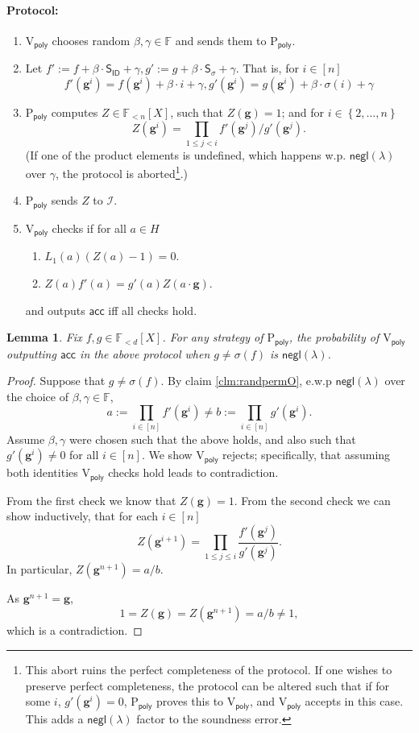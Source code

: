 \documentclass[11pt]{article} %
\newcommand{\F}{\ensuremath{\mathbb F}\xspace}
\newcommand{\sigof}[1]{\ensuremath{\sigma(#1)}\xspace}
\newcommand{\negl}{\ensuremath{\mathsf{negl}(\lambda)}\xspace}
\newcommand{\acc}{\ensuremath{\mathsf{acc}}\xspace}
\newcommand{\defeq}{:=}
\newcommand{\dom}{\ensuremath{H}\xspace}
\newcommand{\prvpoly}{\ensuremath{\mathrm{P_{\mathsf{poly}}}}\xspace}
\newcommand{\verpoly}{\ensuremath{\mathrm{V_{\mathsf{poly}}}}\xspace}
\newcommand{\ideal}{\ensuremath{\mathcal{I}}\xspace}
\newcommand{\set}[1]{\ensuremath{\left\{#1\right\}}\xspace}
\newcommand{\hgen}{\ensuremath{\mathbf{g}}\xspace}
\newcommand{\polysofdeg}[1]{\ensuremath{\F_{< #1}[X]}\xspace}
\newcommand{\sigpoly}{\ensuremath{\mathsf{S_{\sigma}}}\xspace}
\newcommand{\idpoly}{\ensuremath{\mathsf{S_{ID}}}\xspace}
\newtheorem{lemma}{Lemma}[section]
\begin{document}
\paragraph{Protocol:}
\begin{enumerate}
 \item\label{item:betgamma} \verpoly chooses random $\beta,\gamma \in\F$ and sends them to \prvpoly.
 \item Let $f'\defeq f+\beta\cdot  \idpoly +\gamma, g'\defeq g+\beta\cdot \sigpoly + \gamma$.
That is, for $i\in [n]$
 \[f'(\hgen^i) = f(\hgen^i) + \beta\cdot i + \gamma,
 g'(\hgen^i) = g(\hgen^i) + \beta\cdot \sigma(i) + \gamma\]
 \item \prvpoly computes $Z \in \polysofdeg{n}$, such that 
 $Z(\hgen) = 1$; and for $i\in \set{2,\ldots,n}$
 \[Z(\hgen^i)  = \prod_{1\leq j <i} f'(\hgen^j)/g'(\hgen^j).\]
 (If one of the product elements is undefined, which happens w.p. \negl over $\gamma$, the protocol is aborted\footnote{This abort ruins the perfect completeness of the protocol. If one wishes to preserve perfect completeness, the protocol can be altered such that if for some $i$, $g'(\hgen^i)=0$, \prvpoly proves this to \verpoly, and \verpoly accepts in this case. This adds a \negl factor to the soundness error.}.)
 \item \prvpoly sends $Z$ to \ideal.
 \item \verpoly checks if for all $a\in \dom$
 \begin{enumerate}
  \item $L_1(a) (Z(a)-1) = 0$.
  \item $Z(a)f'(a) = g'(a)Z(a\cdot \hgen)$.
 \end{enumerate}
and outputs \acc iff all checks hold.
\end{enumerate}


\begin{lemma}\label{lem:permprotocol}
Fix $f,g \in \polysofdeg{d}$.
For any strategy of \prvpoly, the probability of \verpoly outputting \acc in the above protocol when $g\neq \sigof{f}$ is \negl.
\end{lemma}
\begin{proof}
 Suppose that $g\neq \sigof{f}$. By claim \ref{clm:randpermO}, e.w.p \negl over the choice of $\beta,\gamma\in \F$, 
 \[a\defeq \prod_{i\in [n]}f'(\hgen^i)\neq b\defeq \prod_{i\in [n]} g'(\hgen^i).\]
 Assume $\beta,\gamma$ were chosen such that the above holds, and also such that $g'(\hgen^i)\neq 0$ for all $i\in [n]$. We show \verpoly rejects; specifically, that assuming both identities \verpoly checks hold leads to contradiction.
 
 From the first check we know that $Z(\hgen) = 1$.
From the second check we can show inductively, that for each $i\in [n]$
\[Z(\hgen^{i+1}) = \prod_{1\leq j \leq i} \frac{f'(\hgen^j)}{g'(\hgen^j)}.\]
In particular, $Z(\hgen^{n+1})=a/b$.

As $\hgen^{n+1}=\hgen$, 
\[1=Z(\hgen) = Z(\hgen^{n+1})= a/b \neq 1,\]
which is a contradiction.
\end{proof}
\end{document}
